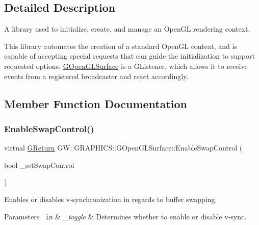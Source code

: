 \subsection{Detailed Description}
A library used to initialize, create, and manage an Open\+GL rendering context. 

This library automates the creation of a standard Open\+GL context, and is capable of accepting special requests that can guide the initialization to support requested options. \mbox{\hyperlink{classGW_1_1GRAPHICS_1_1GOpenGLSurface}{G\+Open\+G\+L\+Surface}} is a G\+Listener, which allows it to receive events from a registered broadcaster and react accordingly. 

\subsection{Member Function Documentation}
\mbox{\label{classGW_1_1GRAPHICS_1_1GOpenGLSurface_a1a4d3e9f9e183a4987bf13187d802e66}} 
\subsubsection{\texorpdfstring{EnableSwapControl()}{EnableSwapControl()}}
{\footnotesize\ttfamily virtual \mbox{\hyperlink{namespaceGW_a67a839e3df7ea8a5c5686613a7a3de21}{G\+Return}} G\+W\+::\+G\+R\+A\+P\+H\+I\+C\+S\+::\+G\+Open\+G\+L\+Surface\+::\+Enable\+Swap\+Control (\begin{DoxyParamCaption}\item[{bool}]{\+\_\+set\+Swap\+Control }\end{DoxyParamCaption})\hspace{0.3cm}{\ttfamily [pure virtual]}}



Enables or disables v-\/synchronization in regards to buffer swapping. 


\begin{DoxyParams}[1]{Parameters}
\mbox{\texttt{ in}}  & {\em \+\_\+toggle} & Determines whether to enable or disable v-\/sync.\\
\hline
\end{DoxyParams}

